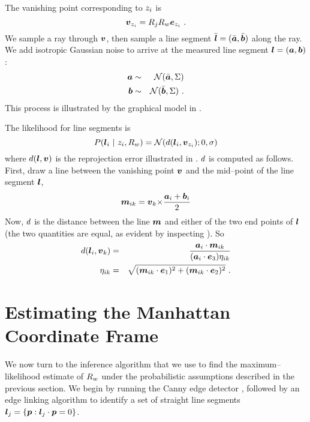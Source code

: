The vanishing point corresponding to $\Indicator_i$ is
\begin{equation}
  \vpt_{\Indicator_i} = \CamR_j \SceneR \ebasis_{\Indicator_i} ~.
\end{equation}
We sample a ray through $\vpt$, then sample a line segment $\TrueSeg =
(\TrueStartPt,\TrueEndPt)$ along the ray. We add isotropic Gaussian
noise to arrive at the measured line segment
$\LineSeg=(\StartPt,\EndPt)$:
\begin{eqnarray}
  \StartPt &\sim& \NormalDistr(\TrueStartPt, \Sigma) \\
  \EndPt &\sim& \NormalDistr(\TrueEndPt, \Sigma) ~.
\end{eqnarray}
This process is illustrated by the graphical model in .

The likelihood for line segments is
\begin{equation}
  P(\LineSeg_i ~|~ \Indicator_i,\SceneR) =
  \NormalDistr(\dist(\LineSeg_i,\vpt_{\Indicator_i}); 0, \sigma)
\end{equation}
where $\dist(\LineSeg,\vpt)$ is the reprojection error illustrated in
. $\dist$ is computed as follows. First,
draw a line between the vanishing point $\vpt$ and the mid--point of
the line segment $\LineSeg$,
\begin{equation}
  \ReprojLine_{ik} =
  \vpt_k \cross \frac{\StartPt_i+\EndPt_i}{2}
\end{equation}
Now, $\dist$ is the distance between the line $\ReprojLine$ and either
of the two end points of $\LineSeg$ (the two quantities are equal, as
evident by inspecting ). So
\begin{eqnarray}
  \dist(\LineSeg_i,\vpt_k) &=& 
  \frac
      {\StartPt_i \cdot \ReprojLine_{ik}}
      {(\StartPt_{i}\cdot\ez) \eta_{ik}}\\
      \eta_{ik} &=&
      \sqrt{(\ReprojLine_{ik} \cdot \ex)^2 +
        (\ReprojLine_{ik} \cdot \ey)^2}
      ~.
\end{eqnarray}

\section{Estimating the Manhattan Coordinate Frame}

We now turn to the inference algorithm that we use to find the
maximum--likelihood estimate of $\SceneR$ under the probabilistic
assumptions described in the previous section. We begin by running the
Canny edge detector \cite{Canny1986}, followed by an edge linking
algorithm \cite{Zhang02} to identify a set of straight line segments
$\LineSeg_j = \{\Pixel : \LineSeg_j\cdot\Pixel = 0\}$.

